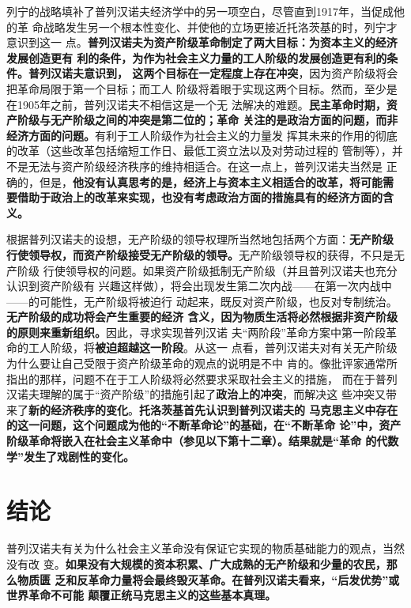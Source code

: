 列宁的战略填补了普列汉诺夫经济学中的另一项空白，尽管直到1917年，当促成他的革
命战略发生另一个根本性变化、并使他的立场更接近托洛茨基的时，列宁才意识到这一
点。\textbf{普列汉诺夫为资产阶级革命制定了两大目标：为资本主义的经济发展创造更有
  利的条件，为作为社会主义力量的工人阶级的发展创造更有利的条件。普列汉诺夫意识到，
  这两个目标在一定程度上存在冲突}，因为资产阶级将会把革命局限于第一个目标；而工人
阶级将着眼于实现这两个目标。然而，至少是在1905年之前，普列汉诺夫不相信这是一个无
法解决的难题。\textbf{民主革命时期，资产阶级与无产阶级之间的冲突是第二位的；革命
  关注的是政治方面的问题，而非经济方面的问题。}有利于工人阶级作为社会主义的力量发
挥其未来的作用的彻底的改革（这些改革包括缩短工作日、最低工资立法以及对劳动过程的
管制等），并不是无法与资产阶级经济秩序的维持相适合。在这一点上，普列汉诺夫当然是
正确的，但是，\textbf{他没有认真思考的是，经济上与资本主义相适合的改革，将可能需
  要借助于政治上的改革来实现，也没有考虑政治方面的措施具有的经济方面的含义。}

根据普列汉诺夫的设想，无产阶级的领导权理所当然地包括两个方面：\textbf{无产阶级
  行使领导权，而资产阶级接受无产阶级的领导。}无产阶级领导权的获得，不只是无产阶级
行使领导权的问题。如果资产阶级抵制无产阶级（并且普列汉诺夫也充分认识到资产阶级有
兴趣这样做），将会出现发生第二次内战——在第一次内战中——的可能性，无产阶级将被迫行
动起来，既反对资产阶级，也反对专制统治。\textbf{无产阶级的成功将会产生重要的经济
  含义，因为物质生活将必然根据非资产阶级的原则来重新组织。}因此，寻求实现普列汉诺
夫“两阶段”革命方案中第一阶段革命的工人阶级，将\textbf{被迫超越这一阶段}。从这一
点看，普列汉诺夫对有关无产阶级为什么要让自己受限于资产阶级革命的观点的说明是不中
肯的。像批评家通常所指出的那样，问题不在于工人阶级将必然要求采取社会主义的措施，
而在于普列汉诺夫理解的属于“资产阶级”的措施引起了\textbf{政治上的冲突}，而解决这
些冲突又带来了\textbf{新的经济秩序的变化}。\textbf{托洛茨基首先认识到普列汉诺夫的
  马克思主义中存在的这一问题，这个问题成为他的“不断革命论”的基础，在“不断革命
  论”中，资产阶级革命将嵌入在社会主义革命中（参见以下第十二章）。结果就是“革命
  的代数学”发生了戏剧性的变化。}

\section{结论}
普列汉诺夫有关为什么社会主义革命没有保证它实现的物质基础能力的观点，当然没有改
变。\textbf{如果没有大规模的资本积累、广大成熟的无产阶级和少量的农民，那么物质匮
  乏和反革命力量将会最终毁灭革命。在普列汉诺夫看来，“后发优势”或世界革命不可能
  颠覆正统马克思主义的这些基本真理。}

